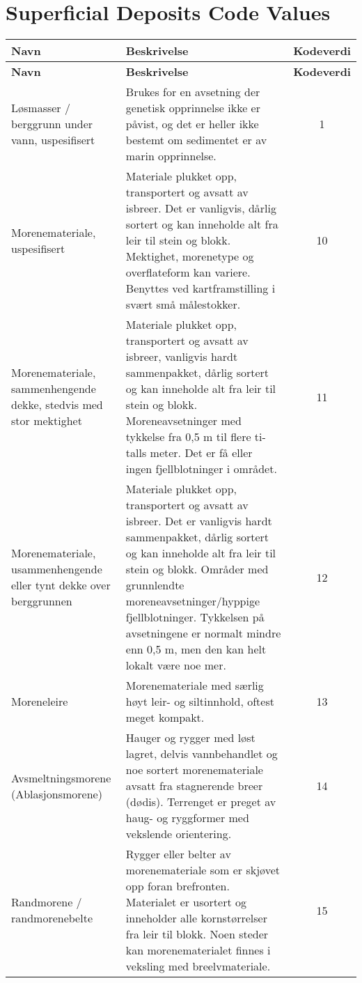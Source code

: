 \chapter{Superficial Deposits Code Values}
\label{appendix:superficial_deposit_codes}
\begin{longtable}{|p{3.5cm}|p{6.2cm}|c|}
    \hline
    \textbf{Navn} & \textbf{Beskrivelse} & \textbf{Kodeverdi}\\ 
    \endfirsthead
    
    \hline
    \textbf{Navn} & \textbf{Beskrivelse} & \textbf{Kodeverdi}\\ 
    \endhead
    \hline
    
    Løsmasser / berggrunn under vann, uspesifisert & Brukes for en avsetning der genetisk opprinnelse ikke er påvist, og det er heller ikke bestemt  om sedimentet er av marin opprinnelse. & 1 \\ \hline
    Morenemateriale, uspesifisert & Materiale plukket opp, transportert og avsatt av isbreer. Det er vanligvis, dårlig sortert og kan inneholde alt fra leir til stein og blokk. Mektighet, morenetype og overflateform kan variere. Benyttes ved kartframstilling i svært små målestokker. & 10 \\ \hline
    Morenemateriale, sammenhengende dekke, stedvis med stor mektighet & Materiale plukket opp, transportert og avsatt av isbreer, vanligvis hardt sammenpakket, dårlig sortert og kan inneholde alt fra leir til stein og blokk. Moreneavsetninger med tykkelse fra 0,5 m til flere ti-talls meter. Det er få eller ingen fjellblotninger i området. & 11 \\ \hline
    Morenemateriale, usammenhengende eller tynt dekke over berggrunnen & Materiale plukket opp, transportert og avsatt av isbreer. Det er vanligvis hardt sammenpakket, dårlig sortert og kan inneholde alt fra leir til stein og blokk. Områder med grunnlendte moreneavsetninger/hyppige fjellblotninger. Tykkelsen på avsetningene er normalt mindre enn 0,5 m, men den kan helt lokalt være noe mer. & 12 \\ \hline
    Moreneleire & Morenemateriale med særlig høyt leir- og siltinnhold, oftest meget kompakt. & 13 \\ \hline
    Avsmeltningsmorene (Ablasjonsmorene) & Hauger og rygger med løst lagret, delvis vannbehandlet og noe sortert morenemateriale avsatt fra stagnerende breer (dødis). Terrenget er preget av haug- og ryggformer med vekslende orientering. & 14 \\ \hline
    Randmorene / randmorenebelte & Rygger eller belter av morenemateriale som er skjøvet opp foran brefronten. Materialet er usortert og inneholder alle kornstørrelser fra leir til blokk. Noen steder kan morenematerialet finnes i veksling med breelvmateriale. & 15 \\ \hline

\end{longtable}

